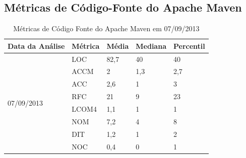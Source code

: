 \begin{apendicesenv}

\chapter{Métricas de Código-Fonte do Apache Maven}
\label{metrics-data}

\begin{table}[ht]
\centering
\begin{tabular}{|l|l|l|l|l|}
\hline
Data da Análise             & Métrica & Média & Mediana & Percentil \\ \hline
\multirow{8}{*}{07/09/2013} & LOC     & 82,7  & 40      & 40        \\ \cline{2-5} 
                            & ACCM    & 2     & 1,3     & 2,7       \\ \cline{2-5} 
                            & ACC     & 2,6   & 1       & 3         \\ \cline{2-5} 
                            & RFC     & 21    & 9       & 23        \\ \cline{2-5} 
                            & LCOM4   & 1,1   & 1       & 1         \\ \cline{2-5} 
                            & NOM     & 7,2   & 4       & 8         \\ \cline{2-5} 
                            & DIT     & 1,2   & 1       & 2         \\ \cline{2-5} 
                            & NOC     & 0,4   & 0       & 1         \\ \hline
\end{tabular}
\label{07/09}
\caption{Métricas de Código Fonte do Apache Maven em 07/09/2013}
\end{table}




\end{apendicesenv}
